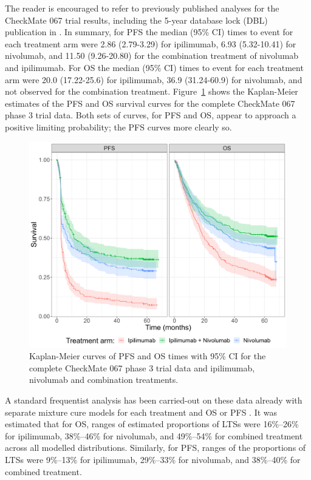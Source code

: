 \documentclass[AMA,STIX1COL]{WileyNJD-v2}
\begin{document}
The reader is encouraged to refer to previously published analyses for the CheckMate 067 trial results, including the 5-year database lock (DBL) publication in \cite{Larkin2019}. In summary, for PFS the median (95\% CI) times to event for each treatment arm were 2.86 (2.79-3.29) for ipilimumab, 6.93 (5.32-10.41) for nivolumab, and 11.50 (9.26-20.80) for the combination treatment of nivolumab and ipilimumab. For OS the median (95\% CI) times to event for each treatment arm were 20.0 (17.22-25.6) for ipilimumab, 36.9 (31.24-60.9) for nivolumab, and not observed for the combination treatment.
Figure~\ref{fig:S_raw_data} shows the Kaplan-Meier estimates of the PFS and OS survival curves for the complete CheckMate 067 phase 3 trial data.
Both sets of curves, for PFS and OS, appear to approach a positive limiting probability; the PFS curves more clearly so.

\begin{figure}[!ht]
\centering
\includegraphics[width=0.6\linewidth]{km_raw_data.png}
\caption{\label{fig:S_raw_data} Kaplan-Meier curves of PFS and OS times with 95\% CI for the complete CheckMate 067 phase 3 trial data and ipilimumab, nivolumab and combination treatments.}
\end{figure}

A standard frequentist analysis has been carried-out on these data already with separate mixture cure models for each treatment and OS or PFS \cite{Mohr2020}.
It was estimated that for OS, ranges of estimated proportions of LTSs were 16\%–26\% for ipilimumab, 38\%–46\% for nivolumab, and 49\%–54\% for combined treatment across all modelled distributions.
Similarly, for PFS, ranges of the proportions of LTSs were 9\%–13\% for ipilimumab, 29\%–33\% for nivolumab, and 38\%–40\% for combined treatment.

%
\end{document}
